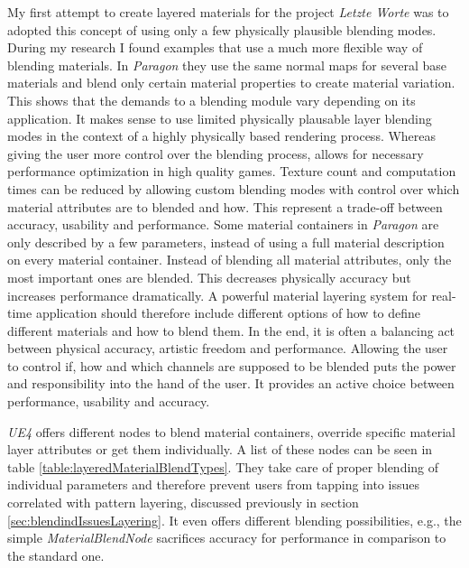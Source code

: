 My first attempt to create layered materials for the project \emph{Letzte Worte} was to adopted this concept of using only a few physically plausible blending modes. During my research I found examples that use a much more flexible way of blending materials. In \emph{Paragon} \cite{paragon2016epic} they use the same normal maps for several base materials and blend only certain material properties to create material variation.
This shows that the demands to a blending module vary depending on its application. It makes sense to use limited physically plausable layer blending modes in the context of a highly physically based rendering process. Whereas giving the user more control over the blending process, allows for necessary performance optimization in high quality games. Texture count and computation times can be reduced by allowing custom blending modes with control over which material attributes are to blended and how. This represent a trade-off between accuracy, usability and performance. Some material containers in \emph{Paragon} are only described by a few parameters, instead of using a full material description on every material container. Instead of blending all material attributes, only the most important ones are blended. This decreases physically accuracy but increases performance dramatically. A powerful material layering system for real-time application should therefore include different options of how to define different materials and how to blend them. In the end, it is often a balancing act between physical accuracy, artistic freedom and performance.  Allowing the user to control if, how and which channels are supposed to be blended puts the power and responsibility into the hand of the user. It provides an active choice between performance,  usability and accuracy.

\emph{UE4} offers different nodes to blend material containers, override specific material layer attributes or get them individually. A list of these nodes can be seen in table \ref{table:layeredMaterialBlendTypes}. They take care of proper blending of individual parameters and therefore prevent users from tapping into issues correlated with pattern layering, discussed previously in section \ref{sec:blendindIssuesLayering}. It even offers different blending possibilities, e.g., the simple \emph{MaterialBlendNode} sacrifices accuracy for performance in comparison to the standard one.

